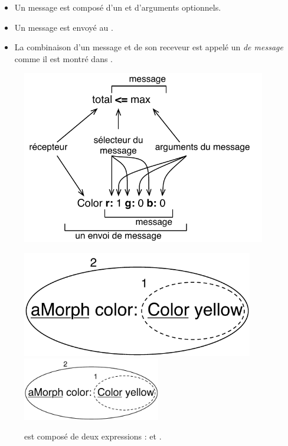 \documentclass[a4paper,10pt,twoside]{book}
\begin{document}
\begin{itemize}
  \item Un message est compos\'e d'un  et d'arguments optionnels.
  \item Un message est envoy\'e au .
  \item La combinaison d'un message et de son receveur est appel\'e un  \emph{de message}  comme il est montr\'e dans .
\end{itemize}

\begin{figure}[htb]
\begin{minipage}{0.53\textwidth}
	\begin{center}
	\includegraphics[width=0.95\textwidth]{message}
	\caption{Deux messages compos\'es d'un receveur, d'un s\'electeur de m\'ethode et d'un ensemble d'arguments.\label{fig:firstScriptMessage}}\end{center}
\end{minipage}
\hfill
\begin{minipage}{0.43\textwidth}
	\begin{center}
	\ifluluelse
		{\includegraphics[width=0.9\textwidth]{uKeyUnOne}}
		{\includegraphics[width=6cm]{uKeyUnOne}}
	\caption{ est compos\'e de deux expressions :  et .\label{fig:ellipse}}
	\end{center}
\end{minipage}
\end{figure}
\end{document}
